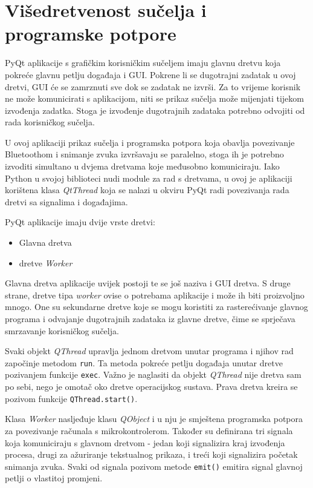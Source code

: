 \section{Višedretvenost sučelja i programske potpore}

PyQt aplikacije s grafičkim korisničkim sučeljem imaju glavnu dretvu koja pokreće glavnu petlju događaja i GUI. Pokrene li se dugotrajni zadatak u ovoj dretvi, GUI će se zamrznuti sve dok se zadatak ne izvrši. Za to vrijeme korisnik ne može komunicirati s aplikacijom, niti se prikaz sučelja može mijenjati tijekom izvođenja zadatka. Stoga je izvođenje dugotrajnih zadataka potrebno odvojiti od rada korisničkog sučelja.

U ovoj aplikaciji prikaz sučelja i programska potpora koja obavlja povezivanje Bluetoothom i snimanje zvuka izvršavaju se paralelno, stoga ih je potrebno izvoditi simultano u dvjema dretvama koje međusobno komuniciraju. Iako Python u svojoj biblioteci nudi module za rad s dretvama, u ovoj je aplikaciji korištena klasa \textit{QtThread} koja se nalazi u okviru PyQt radi povezivanja rada dretvi sa signalima i događajima.

PyQt aplikacije imaju dvije vrste dretvi:
\begin{itemize}
	\item Glavna dretva
	\item dretve \textit{Worker}
\end{itemize}

Glavna dretva aplikacije uvijek postoji te se još naziva i GUI dretva. S druge strane, dretve tipa \textit{worker} ovise o potrebama aplikacije i može ih biti proizvoljno mnogo. One su sekundarne dretve koje se mogu koristiti za rasterećivanje glavnog programa i odvajanje dugotrajnih zadataka iz glavne dretve, čime se sprječava smrzavanje korisničkog sučelja. 

Svaki objekt \textit{QThread} upravlja jednom dretvom unutar programa i njihov rad započinje metodom \lstinline|run|. Ta metoda pokreće petlju događaja unutar dretve pozivanjem funkcije \lstinline|exec|. Važno je naglasiti da objekt \textit{QThread} nije dretva sam po sebi, nego je omotač oko dretve operacijskog sustava. Prava dretva kreira se pozivom funkcije \lstinline|QThread.start()|.

Klasa \textit{Worker} nasljeđuje klasu \textit{QObject} i u nju je smještena programska potpora za povezivanje računala s mikrokontrolerom. Također su definirana tri signala koja komuniciraju s glavnom dretvom - jedan koji signalizira kraj izvođenja procesa, drugi za ažuriranje tekstualnog prikaza, i treći koji signalizira početak snimanja zvuka. Svaki od signala pozivom metode \lstinline|emit()| emitira signal glavnoj petlji o vlastitoj promjeni. 

